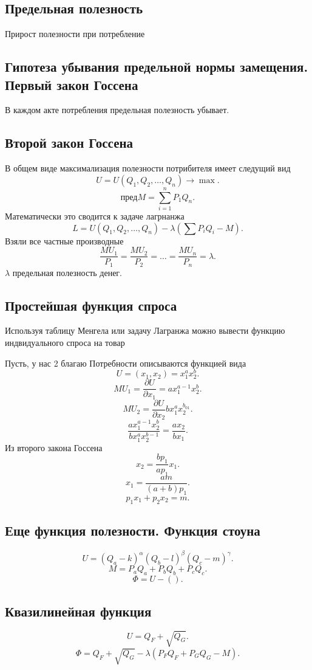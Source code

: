 \documentclass[14pt]{extarticle}
\begin{document}
\subsection{Предельная полезность}
Прирост полезности при потребление
\subsection{Гипотеза убывания предельной нормы замещения. Первый закон Госсена}
В каждом акте потребления предельная полезность убывает.
\subsection{Второй закон Госсена}
В общем виде максимализация полезности потрибителя имеет следущий вид
\[
U = U(Q_1,Q_2,\dots,Q_{n}) \to \max
.\] 
\[
    \text{пред} M = \sum_{i=1}^{n} P_1 Q_{n}
.\] 
Математически это сводится к задаче лагрнанжа
\[
L = U(Q_1,Q_2,\dots,Q_{n}) - \lambda(\sum P_{i} Q_{i} - M)
.\] 
Взяли все частные производные
\[
\frac{M U_1}{P_1} = \frac{M U_2}{P_{2}} = \dots = \frac{M U_{n}}{P_{n}}  = \lambda
.\] 
$\lambda$ предельная полезность денег. 
\subsection{Простейшая функция спроса}
Используя таблицу Менгела или задачу Лагранжа можно вывести функцию индвидуального спроса на товар

Пусть, у нас 2 благаю Потребности описываются функцией вида
 \[
U = (x_1,x_2) = x_1^{a} x_2^{b}
.\] 
\[
M U_1 = \frac{\partial U}{\partial x_1} = ax_1^{a -1} x_2^{b}
.\] 
\[
M U_2 = \frac{\partial U}{\partial x_2} bx_1^{a} x_2^{b_{01}}
.\] 
\[
    \frac{ax_1^{a-1} x_2^{b}}{bx_1^{a} x_2^{b -1}} = \frac{ax_2}{bx_1}
.\] 
Из второго закона Госсена
\[
x_2 = \frac{b p_1}{a p_1} x_1
.\] 
\[
x_1 = \frac{a m}{(a + b) p_1}
.\] 
\[
p_1 x_1 + p_2 x_2 = m 
.\] 
\subsection{Еще функция полезности. Функция стоуна}
\[
U = (Q_{a} - k)^{\alpha} (Q_{b} - l)^{\beta} (Q_{c} - m)^{\gamma}
.\] 
\[
M = P_{a} Q_{a} + P_{b} Q_{b} + P_{c} Q_{c}
.\] 
\[
 \Phi = U - ()
.\] 
\subsection{Квазилинейная функция}
\[
U = Q_{F} + \sqrt{Q_{G}} 
.\] 
\[
\Phi = Q_{F} + \sqrt{Q_{G}} - \lambda (P_{F} Q_{F} + P_{G} Q_{G}  - M)
.\] 
\end{document}

